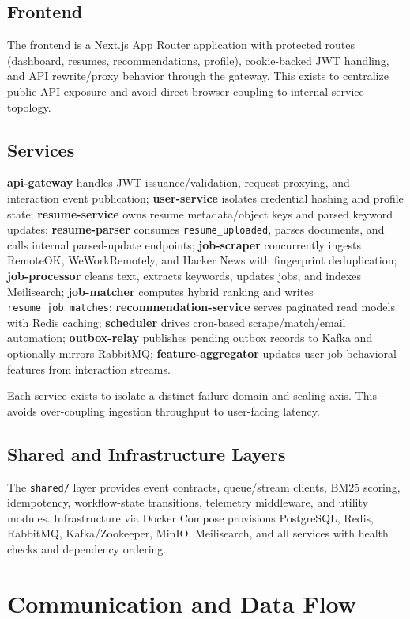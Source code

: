\documentclass[conference]{IEEEtran}
\begin{document}
\subsection{Frontend}
The frontend is a Next.js App Router application with protected routes (dashboard, resumes, recommendations, profile), cookie-backed JWT handling, and API rewrite/proxy behavior through the gateway. This exists to centralize public API exposure and avoid direct browser coupling to internal service topology.

\subsection{Services}
\textbf{api-gateway} handles JWT issuance/validation, request proxying, and interaction event publication; \textbf{user-service} isolates credential hashing and profile state; \textbf{resume-service} owns resume metadata/object keys and parsed keyword updates; \textbf{resume-parser} consumes \texttt{resume\_uploaded}, parses documents, and calls internal parsed-update endpoints; \textbf{job-scraper} concurrently ingests RemoteOK, WeWorkRemotely, and Hacker News with fingerprint deduplication; \textbf{job-processor} cleans text, extracts keywords, updates jobs, and indexes Meilisearch; \textbf{job-matcher} computes hybrid ranking and writes \texttt{resume\_job\_matches}; \textbf{recommendation-service} serves paginated read models with Redis caching; \textbf{scheduler} drives cron-based scrape/match/email automation; \textbf{outbox-relay} publishes pending outbox records to Kafka and optionally mirrors RabbitMQ; \textbf{feature-aggregator} updates user-job behavioral features from interaction streams.

Each service exists to isolate a distinct failure domain and scaling axis. This avoids over-coupling ingestion throughput to user-facing latency.

\subsection{Shared and Infrastructure Layers}
The \texttt{shared/} layer provides event contracts, queue/stream clients, BM25 scoring, idempotency, workflow-state transitions, telemetry middleware, and utility modules. Infrastructure via Docker Compose provisions PostgreSQL, Redis, RabbitMQ, Kafka/Zookeeper, MinIO, Meilisearch, and all services with health checks and dependency ordering.

\section{Communication and Data Flow}
\end{document}
